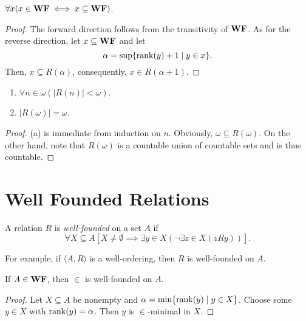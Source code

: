 
\begin{lemma}
    $\forall x(x\in\mathbf{WF}\iff x\subseteq\mathbf{WF})$.
\end{lemma}
\begin{proof}
    The forward direction follows from the transitivity of $\mathbf{WF}$. As for the reverse direction, let $x\subseteq\mathbf{WF}$ and let 
    \begin{equation*}
        \alpha = \sup\{\operatorname{rank}(y) + 1\mid y\in x\}.
    \end{equation*}
    Then, $x\subseteq R(\alpha)$, consequently, $x\in R(\alpha + 1)$.
\end{proof}

\begin{lemma}
    \begin{enumerate}[label=(\alph*)]
        \item $\forall n\in\omega(|R(n)| < \omega)$.
        \item $|R(\omega)| = \omega$.
    \end{enumerate}
\end{lemma}
\begin{proof}
    (a) is immediate from induction on $n$. Obviously, $\omega\subseteq R(\omega)$. On the other hand, note that $R(\omega)$ is a countable union of countable sets and is thus countable.
\end{proof}

\section{Well Founded Relations}

\begin{definition}
    A relation $R$ is \emph{well-founded} on a set $A$ if 
    \begin{equation*}
        \forall X\subseteq A\left[X\ne\emptyset\implies\exists y\in X\left(\neg\exists z\in X\left(z R y\right)\right)\right].
    \end{equation*}
\end{definition}

For example, if $\langle A, R\rangle$ is a well-ordering, then $R$ is well-founded on $A$.

\begin{lemma}
    If $A\in\mathbf{WF}$, then $\in$ is well-founded on $A$.
\end{lemma}
\begin{proof}
    Let $X\subseteq A$ be nonempty and $\alpha = \min\{\operatorname{rank}(y)\mid y\in X\}$. Choose some $y\in X$ with $\operatorname{rank}(y) = \alpha$. Then $y$ is $\in$-minimal in $X$.
\end{proof}

